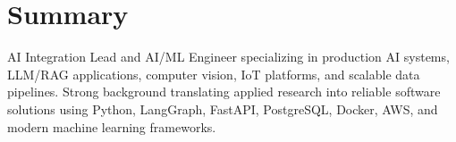     \vspace{-0.3 cm}


    \section{Summary}



        
    \begin{onecolentry}
AI Integration Lead and AI/ML Engineer specializing in production AI systems, LLM/RAG applications, computer vision, IoT platforms, and scalable data pipelines. Strong background translating applied research into reliable software solutions using Python, LangGraph, FastAPI, PostgreSQL, Docker, AWS, and modern machine learning frameworks.
    \end{onecolentry}


        \vspace{-0.2 cm}

